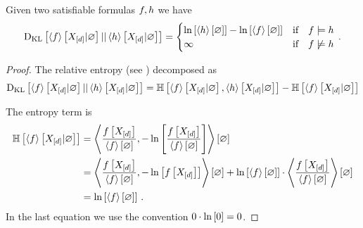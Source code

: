 \begin{lemma}\label{lem:relEntropyFormulas}
    Given two satisfiable formulas $f,h$ we have
    \begin{align*}
        \mathrm{D}_{\mathrm{KL}}\left[ \left\langle f\right\rangle \left[ X_{[d]} | \varnothing \right] || \left\langle h\right\rangle \left[ X_{[d]} | \varnothing \right] \right]
        = \begin{cases}
              \ln \left[ \left\langle h\right\rangle \left[ \varnothing \right] \right] - \ln \left[ \left\langle f\right\rangle \left[ \varnothing \right] \right] & \text{if}\quad f\models h \\
              \infty & \text{if}\quad f\not\models h
        \end{cases} \, .
    \end{align*}
\end{lemma}
\begin{proof}
    The relative entropy (see ) decomposed as
    \begin{align*}
        \mathrm{D}_{\mathrm{KL}}\left[ \left\langle f\right\rangle \left[ X_{[d]} | \varnothing \right] || \left\langle h\right\rangle \left[ X_{[d]} | \varnothing \right] \right]
        = \mathbb{H}\left[\left\langle f\right\rangle \left[ X_{[d]} | \varnothing \right],\left\langle h\right\rangle \left[ X_{[d]} | \varnothing \right]\right]
        - \mathbb{H}\left[\left\langle f\right\rangle \left[ X_{[d]} | \varnothing \right]\right]
    \end{align*}

    The entropy term is
    \begin{align*}
        \mathbb{H}\left[\left\langle f\right\rangle \left[ X_{[d]} | \varnothing \right]\right]
        &= \left\langle \frac{f\left[X_{[d]}\right]}{\left\langle f\right\rangle \left[ \varnothing \right]},-\ln \left[ \frac{f\left[X_{[d]}\right]}{\left\langle f\right\rangle \left[ \varnothing \right]} \right]\right\rangle \left[ \varnothing \right] \\
        &= \left\langle \frac{f\left[X_{[d]}\right]}{\left\langle f\right\rangle \left[ \varnothing \right]},-\ln \left[ f\left[X_{[d]}\right] \right]\right\rangle \left[ \varnothing \right]
        + \ln \left[ \left\langle f\right\rangle \left[ \varnothing \right] \right] \cdot \left\langle \frac{f\left[X_{[d]}\right]}{\left\langle f\right\rangle \left[ \varnothing \right]}\right\rangle \left[ \varnothing \right]  \\
        &= \ln \left[ \left\langle f\right\rangle \left[ \varnothing \right] \right] \, .
    \end{align*}
    In the last equation we use the convention $0\cdot\ln \left[ 0 \right]=0$.


\end{proof}
